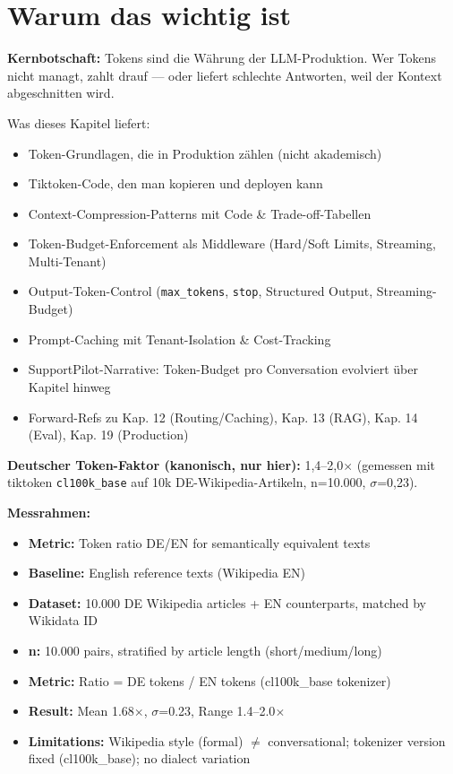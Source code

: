 \section{Warum das wichtig ist}
\label{sec:why_token_management}

\textbf{Kernbotschaft:} Tokens sind die Währung der LLM-Produktion. Wer Tokens nicht managt, zahlt drauf --- oder liefert schlechte Antworten, weil der Kontext abgeschnitten wird.

Was dieses Kapitel liefert:
\begin{itemize}[leftmargin=*]
  \item Token-Grundlagen, die in Produktion zählen (nicht akademisch)
  \item Tiktoken-Code, den man kopieren und deployen kann
  \item Context-Compression-Patterns mit Code \& Trade-off-Tabellen
  \item Token-Budget-Enforcement als Middleware (Hard/Soft Limits, Streaming, Multi-Tenant)
  \item Output-Token-Control (\texttt{max\_tokens}, \texttt{stop}, Structured Output, Streaming-Budget)
  \item Prompt-Caching mit Tenant-Isolation \& Cost-Tracking
  \item SupportPilot-Narrative: Token-Budget pro Conversation evolviert über Kapitel hinweg
  \item Forward-Refs zu Kap. 12 (Routing/Caching), Kap. 13 (RAG), Kap. 14 (Eval), Kap. 19 (Production)
\end{itemize}

\textbf{Deutscher Token-Faktor (kanonisch, nur hier):} 1,4--2,0$\times$ (gemessen mit tiktoken \texttt{cl100k\_base} auf 10k DE-Wikipedia-Artikeln, n=10.000, $\sigma$=0,23). 

\textbf{Messrahmen:}
\begin{itemize}
  \item \textbf{Metric:} Token ratio DE/EN for semantically equivalent texts
  \item \textbf{Baseline:} English reference texts (Wikipedia EN)
  \item \textbf{Dataset:} 10.000 DE Wikipedia articles + EN counterparts, matched by Wikidata ID
  \item \textbf{n:} 10.000 pairs, stratified by article length (short/medium/long)
  \item \textbf{Metric:} Ratio = DE tokens / EN tokens (cl100k\_base tokenizer)
  \item \textbf{Result:} Mean 1.68$\times$, $\sigma$=0.23, Range 1.4–2.0$\times$
  \item \textbf{Limitations:} Wikipedia style (formal) $\neq$ conversational; tokenizer version fixed (cl100k\_base); no dialect variation
\end{itemize}

